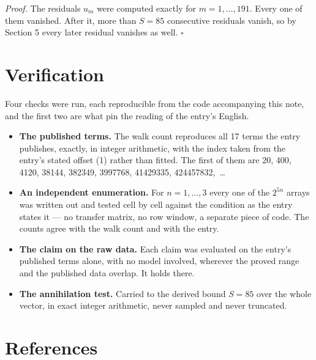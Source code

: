 \documentclass[11pt]{article}
\theoremstyle{definition}
\begin{document}
{\itshape Proof.} The residuals $u_m$ were computed exactly for $m = 1,\dots,191$. Every one of them vanished. After it, more than $S = 85$ consecutive residuals vanish, so by Section 5 every later residual vanishes as well. $\square$

\section{Verification}

Four checks were run, each reproducible from the code accompanying this note, and the first two are what pin the reading of the entry's English.

\begin{itemize}

\item {\bfseries The published terms.} The walk count reproduces all 17 terms the entry publishes, exactly, in integer arithmetic, with the index taken from the entry's stated offset (1) rather than fitted. The first of them are 20, 400, 4120, 38144, 382349, 3997768, 41429335, 424457832,~\dots

\item {\bfseries An independent enumeration.} For $n = 1,\dots,3$ every one of the $2^{5n}$ arrays was written out and tested cell by cell against the condition as the entry states it --- no transfer matrix, no row window, a separate piece of code. The counts agree with the walk count and with the entry.

\item {\bfseries The claim on the raw data.} Each claim was evaluated on the entry's published terms alone, with no model involved, wherever the proved range and the published data overlap. It holds there.

\item {\bfseries The annihilation test.} Carried to the derived bound $S = 85$ over the whole vector, in exact integer arithmetic, never sampled and never truncated.

\end{itemize}

\section{References}
\end{document}
